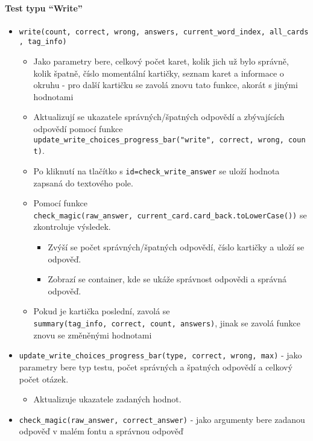 \documentclass[11pt]{article}
\providecommand{\tightlist}{\setlength{\itemsep}{1pt}\setlength{\parskip}{1pt}}
\let\oldtexttt\texttt
\renewcommand{\texttt}[1]{\oldtexttt{\textcolor{codehighlight}{#1}}}
\begin{document}
\hypertarget{test-typu-write}{%
\paragraph{Test typu ``Write''}\label{test-typu-write}}

\begin{itemize}
\tightlist
\item
  \texttt{write(count,\ correct,\ wrong,\ answers,\ current\_word\_index,\ all\_cards,\ tag\_info)}

  \begin{itemize}
  \tightlist
  \item
    Jako parametry bere, celkový počet karet, kolik jich už bylo
    správně, kolik špatně, číslo momentální kartičky, seznam karet a
    informace o okruhu - pro další kartičku se zavolá znovu tato funkce,
    akorát s jinými hodnotami
  \item
    Aktualizují se ukazatele správných/špatných odpovědí a zbývajících
    odpovědí pomocí funkce
    \texttt{update\_write\_choices\_progress\_bar("write",\ correct,\ wrong,\ count)}.
  \item
    Po kliknutí na tlačítko s \texttt{id=check\_write\_answer} se uloží
    hodnota zapsaná do textového pole.
  \item
    Pomocí funkce
    \texttt{check\_magic(raw\_answer,\ current\_card.card\_back.toLowerCase())}
    se zkontroluje výsledek.

    \begin{itemize}
    \tightlist
    \item
      Zvýší se počet správných/špatných odpovědí, číslo kartičky a uloží
      se odpověď.
    \item
      Zobrazí se container, kde se ukáže správnost odpovědi a správná
      odpověď.
    \end{itemize}
  \item
    Pokud je kartička poslední, zavolá se
    \texttt{summary(tag\_info,\ correct,\ count,\ answers)}, jinak se
    zavolá funkce znovu se změněnými hodnotami
  \end{itemize}
\item
  \texttt{update\_write\_choices\_progress\_bar(type,\ correct,\ wrong,\ max)}
  - jako parametry bere typ testu, počet správných a špatných odpovědí a
  celkový počet otázek.

  \begin{itemize}
  \tightlist
  \item
    Aktualizuje ukazatele zadaných hodnot.
  \end{itemize}
\item
  \texttt{check\_magic(raw\_answer,\ correct\_answer)} - jako argumenty
  bere zadanou odpověď v malém fontu a správnou odpověď


\end{itemize}
\end{document}
